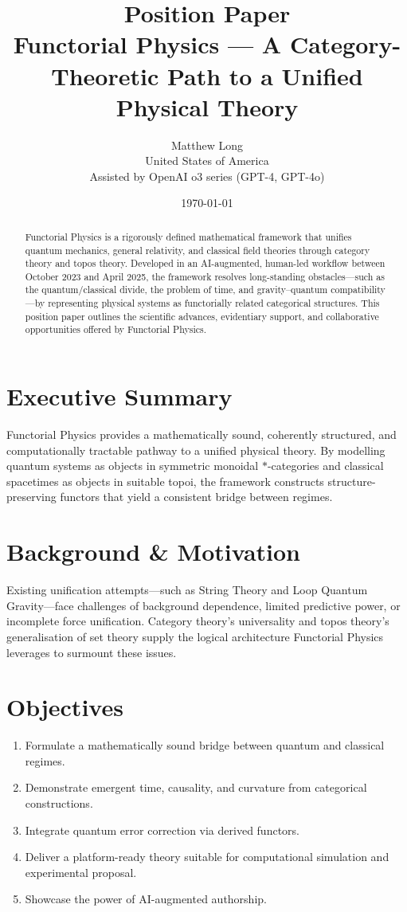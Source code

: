 \documentclass[11pt]{article}
\title{Position Paper\\Functorial Physics — A Category-Theoretic Path to a Unified Physical Theory}
\author{Matthew Long \\ United States of America \\ Assisted by OpenAI o3 series (GPT-4, GPT-4o)}
\date{\today}
\begin{document}
\maketitle

\begin{abstract}
Functorial Physics is a rigorously defined mathematical framework that unifies quantum mechanics, general relativity, and classical field theories through category theory and topos theory. Developed in an AI-augmented, human-led workflow between October 2023 and April 2025, the framework resolves long-standing obstacles—such as the quantum/classical divide, the problem of time, and gravity–quantum compatibility—by representing physical systems as functorially related categorical structures. This position paper outlines the scientific advances, evidentiary support, and collaborative opportunities offered by Functorial Physics.
\end{abstract}

\section{Executive Summary}
Functorial Physics provides a mathematically sound, coherently structured, and computationally tractable pathway to a unified physical theory. By modelling quantum systems as objects in symmetric monoidal $*$-categories and classical spacetimes as objects in suitable topoi, the framework constructs structure-preserving functors that yield a consistent bridge between regimes.

\section{Background \& Motivation}
Existing unification attempts—such as String Theory and Loop Quantum Gravity—face challenges of background dependence, limited predictive power, or incomplete force unification. Category theory’s universality and topos theory’s generalisation of set theory supply the logical architecture Functorial Physics leverages to surmount these issues.

\section{Objectives}
\begin{enumerate}
\item Formulate a mathematically sound bridge between quantum and classical regimes.
\item Demonstrate emergent time, causality, and curvature from categorical constructions.
\item Integrate quantum error correction via derived functors.
\item Deliver a platform-ready theory suitable for computational simulation and experimental proposal.
\item Showcase the power of AI-augmented authorship.
\end{enumerate}
\end{document}
